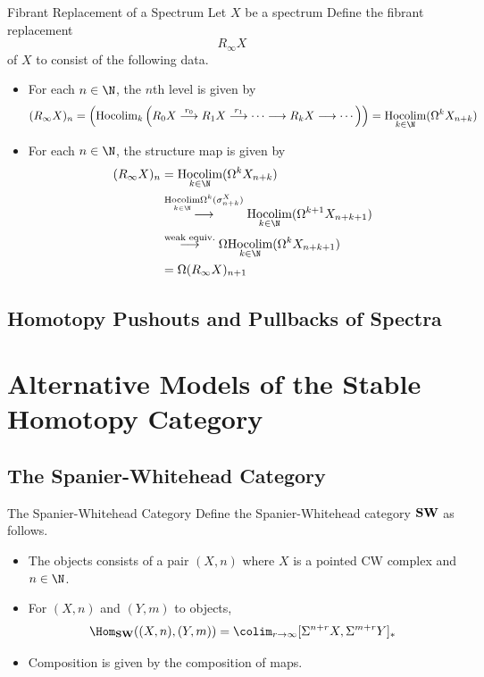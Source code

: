 \documentclass[a4paper]{article}
\begin{document}
\begin{defn}{Fibrant Replacement of a Spectrum}{} Let $X$ be a spectrum Define the fibrant replacement $$R_\infty X$$ of $X$ to consist of the following data. 
\begin{itemize}
\item For each $n\in\N$, the $n$th level is given by $$(R_\infty X)_n=\left(\text{Hocolim}_k\left(R_0X\overset{r_0}{\longrightarrow}R_1X\overset{r_1}{\longrightarrow}\cdots\longrightarrow R_kX\longrightarrow\cdots\right)\right)=\underset{k\in\N}{\text{Hocolim}}(\Omega^k X_{n+k})$$
\item For each $n\in\N$, the structure map is given by
\begin{align*}
(R_\infty X)_n&=\underset{k\in\N}{\text{Hocolim}}(\Omega^k X_{n+k})\\
&\overset{\underset{k\in\N}{\text{Hocolim}}\Omega^k(\sigma_{n+k}^X)}{\longrightarrow}\underset{k\in\N}{\text{Hocolim}}(\Omega^{k+1}X_{n+k+1})\\
&\overset{\text{weak equiv.}}{\longrightarrow}\Omega\underset{k\in\N}{\text{Hocolim}}(\Omega^kX_{n+k+1})\\
&=\Omega(R_\infty X)_{n+1}
\end{align*}
\end{itemize}
\end{defn}

\subsection{Homotopy Pushouts and Pullbacks of Spectra}

\pagebreak
\section{Alternative Models of the Stable Homotopy Category}
\subsection{The Spanier-Whitehead Category}
\begin{defn}{The Spanier-Whitehead Category}{} Define the Spanier-Whitehead category $\bold{SW}$ as follows. 
\begin{itemize}
\item The objects consists of a pair $(X,n)$ where $X$ is a pointed CW complex and $n\in\N$. 
\item For $(X,n)$ and $(Y,m)$ to objects, $$\Hom_{\bold{SW}}((X,n),(Y,m))=\colim_{r\to\infty}[\Sigma^{n+r}X,\Sigma^{m+r}Y]_\ast$$
\item Composition is given by the composition of maps. 
\end{itemize}
\end{defn}
\end{document}
